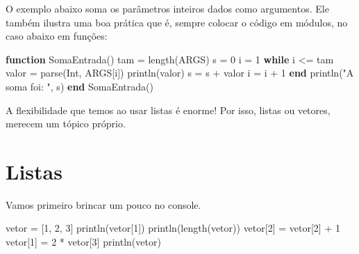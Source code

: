 \documentclass[
  letterpaper,
  DIV=11,
  numbers=noendperiod]{scrreprt}
\newenvironment{Shaded}{\begin{snugshade}}{\end{snugshade}}
\newcommand{\ConstantTok}[1]{\textcolor[rgb]{0.56,0.35,0.01}{#1}}
\newcommand{\ControlFlowTok}[1]{\textcolor[rgb]{0.00,0.23,0.31}{\textbf{#1}}}
\newcommand{\DataTypeTok}[1]{\textcolor[rgb]{0.68,0.00,0.00}{#1}}
\newcommand{\FloatTok}[1]{\textcolor[rgb]{0.68,0.00,0.00}{#1}}
\newcommand{\FunctionTok}[1]{\textcolor[rgb]{0.28,0.35,0.67}{#1}}
\newcommand{\KeywordTok}[1]{\textcolor[rgb]{0.00,0.23,0.31}{\textbf{#1}}}
\newcommand{\NormalTok}[1]{\textcolor[rgb]{0.00,0.23,0.31}{#1}}
\newcommand{\OperatorTok}[1]{\textcolor[rgb]{0.37,0.37,0.37}{#1}}
\newcommand{\StringTok}[1]{\textcolor[rgb]{0.13,0.47,0.30}{#1}}
\begin{document}
O exemplo abaixo soma os parâmetros inteiros dados como argumentos. Ele
também ilustra uma boa prática que é, sempre colocar o código em
módulos, no caso abaixo em funções:

\begin{Shaded}
\begin{Highlighting}[]
\KeywordTok{function} \FunctionTok{SomaEntrada}\NormalTok{()}
\NormalTok{    tam }\OperatorTok{=} \FunctionTok{length}\NormalTok{(}\ConstantTok{ARGS}\NormalTok{)}
\NormalTok{    s }\OperatorTok{=} \FloatTok{0}
\NormalTok{    i }\OperatorTok{=} \FloatTok{1}
    \ControlFlowTok{while}\NormalTok{ i }\OperatorTok{\textless{}=}\NormalTok{ tam}
\NormalTok{        valor }\OperatorTok{=} \FunctionTok{parse}\NormalTok{(}\DataTypeTok{Int}\NormalTok{, }\ConstantTok{ARGS}\NormalTok{[i])}
        \FunctionTok{println}\NormalTok{(valor)}
\NormalTok{        s }\OperatorTok{=}\NormalTok{ s }\OperatorTok{+}\NormalTok{ valor}
\NormalTok{        i }\OperatorTok{=}\NormalTok{ i }\OperatorTok{+} \FloatTok{1}
    \ControlFlowTok{end}
    \FunctionTok{println}\NormalTok{(}\StringTok{"A soma foi: "}\NormalTok{, s)}
\KeywordTok{end}
\FunctionTok{SomaEntrada}\NormalTok{()}
\end{Highlighting}
\end{Shaded}

A flexibilidade que temos ao usar listas é enorme! Por isso, listas ou
vetores, merecem um tópico próprio.

\section{Listas}\label{listas}

Vamos primeiro brincar um pouco no console.

\begin{Shaded}
\begin{Highlighting}[]
\NormalTok{vetor }\OperatorTok{=}\NormalTok{ [}\FloatTok{1}\NormalTok{, }\FloatTok{2}\NormalTok{, }\FloatTok{3}\NormalTok{]}
\FunctionTok{println}\NormalTok{(vetor[}\FloatTok{1}\NormalTok{])}
\FunctionTok{println}\NormalTok{(}\FunctionTok{length}\NormalTok{(vetor))}
\NormalTok{vetor[}\FloatTok{2}\NormalTok{] }\OperatorTok{=}\NormalTok{ vetor[}\FloatTok{2}\NormalTok{] }\OperatorTok{+} \FloatTok{1}
\NormalTok{vetor[}\FloatTok{1}\NormalTok{] }\OperatorTok{=} \FloatTok{2} \OperatorTok{*}\NormalTok{ vetor[}\FloatTok{3}\NormalTok{]}
\FunctionTok{println}\NormalTok{(vetor)}
\end{Highlighting}
\end{Shaded}
\end{document}
